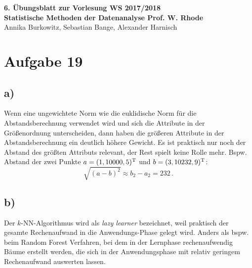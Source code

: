 \documentclass[a4paper, 11pt]{article}
\begin{document}
\noindent
\large{\textbf{6. Übungsblatt zur Vorlesung \hfill WS 2017/2018 \\
Statistische Methoden der Datenanalyse \hfill Prof. W. Rhode}} \\
Annika Burkowitz, Sebastian Bange, Alexander Harnisch \\
\noindent\makebox[\linewidth]{\rule{\textwidth}{0.4pt}}

\section*{Aufgabe 19}
\subsection*{a)}
Wenn eine ungewichtete Norm wie die euklidische Norm für die Abstandsberechnung
verwendet wird und sich die Attribute in der Größenordnung unterscheiden, dann
haben die größeren Attribute in der Abstandsberechnung ein deutlich höhere
Gewicht. Es ist praktisch nur noch der Abstand des größten Attributs relevant,
der Rest spielt keine Rolle mehr. Bspw. Abstand der zwei Punkte $a = (1, 10000,
5)^{\textup{T}}$ und $b = (3, 10232, 9)^{\textup{T}}$:
\begin{equation}
    \sqrt{(a - b)^2} \approx b_2 - a_2 = 232\,.
\end{equation}

\subsection*{b)}
Der $k$-NN-Algorithmus wird als \textit{lazy learner} bezeichnet, weil
praktisch der gesamte Rechenaufwand in die Anwendungs-Phase gelegt wird. Anders
als bspw. beim Random Forest Verfahren, bei dem in der Lernphase
rechenaufwendig Bäume erstellt werden, die sich in der Anwendungsphase mit
relativ geringem Rechenaufwand auswerten lassen.
\end{document}
